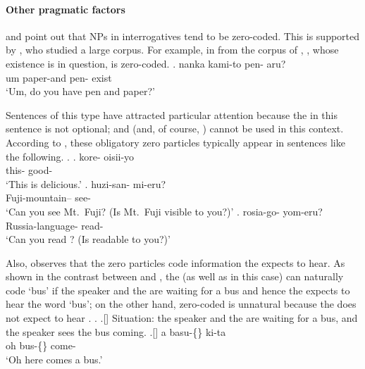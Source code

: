 




\paragraph{Other pragmatic factors}

 and  point out that
NPs in interrogatives tend to be zero-coded.
This is supported by ,
who studied a large corpus.
For example,
in \Next from the corpus of ,
, whose existence is in question, is zero-coded.
%
\exg. nanka kami-to pen-\EM{\O} aru? \\
      um paper-and pen-\ci{\O} exist \\
      `Um, do you have pen and paper?'
      \hfill{\cite[120]{fry01}}

Sentences of this type have attracted particular attention
because the  in this sentence is not optional;
 and  (and, of course, ) cannot be used in this context.
According to ,
these obligatory zero particles typically appear in sentences like
the following.
%
\ex.
 \ag. kore-\EM{\O} oisii-yo \\
      this-\ci{\O} good- \\
      `This is delicious.'
 \bg. huzi-san-\EM{\O} mi-eru? \\
      Fuji-mountain--\ci{\O} see- \\
      `Can you see Mt.~Fuji? (Is Mt.~Fuji visible to you?)'
 \bg. rosia-go-\EM{\O} yom-eru? \\
      Russia-language-\ci{\O} read- \\
      `Can you read ? (Is  readable to you?)'
      \hfill{\cite[48]{onoe87}}


Also,  observes that
the zero particles code information the  expects to hear.
As shown in the contrast between \Next and \NNext,
the  (as well as  in this case) can naturally code  `bus' \Next
if the speaker and the  are waiting for a bus and hence
the  expects to hear the word  `bus';
on the other hand,
zero-coded  \NNext is unnatural
because the  does not expect to hear .
%
\ex.
 \a.[] Situation: the speaker and the  are waiting for a bus,
       and the speaker sees the bus coming.
 \bg.[] a basu-\{\} ki-ta \\
      oh bus-\{\} come- \\
      `Oh here comes a bus.'
      \hfill{\cite[120]{tsutsui84}}

